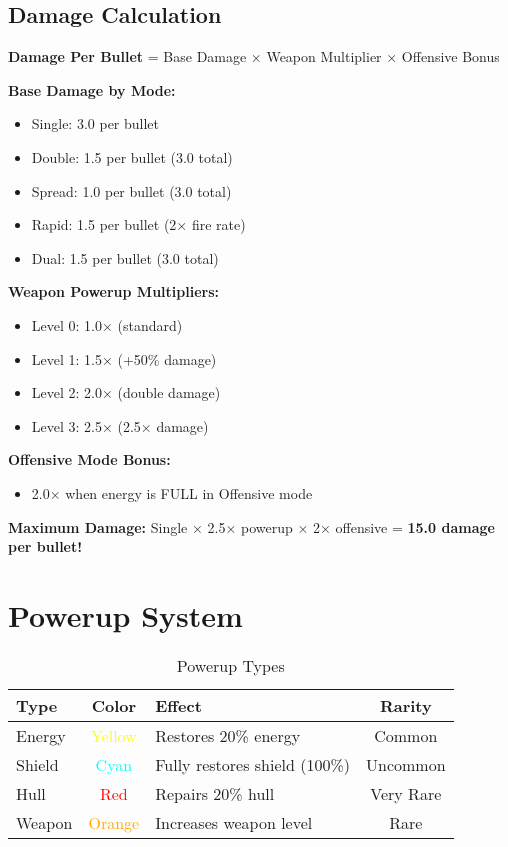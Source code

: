 \documentclass[11pt,a4paper]{article}
\begin{document}
\subsection{Damage Calculation}

\begin{center}
\large
\textbf{Damage Per Bullet} = Base Damage × Weapon Multiplier × Offensive Bonus
\end{center}

\textbf{Base Damage by Mode:}
\begin{itemize}
    \item Single: 3.0 per bullet
    \item Double: 1.5 per bullet (3.0 total)
    \item Spread: 1.0 per bullet (3.0 total)
    \item Rapid: 1.5 per bullet (2× fire rate)
    \item Dual: 1.5 per bullet (3.0 total)
\end{itemize}

\textbf{Weapon Powerup Multipliers:}
\begin{itemize}
    \item Level 0: 1.0× (standard)
    \item Level 1: 1.5× (+50\% damage)
    \item Level 2: 2.0× (double damage)
    \item Level 3: 2.5× (2.5× damage)
\end{itemize}

\textbf{Offensive Mode Bonus:}
\begin{itemize}
    \item 2.0× when energy is FULL in Offensive mode
\end{itemize}

\textbf{Maximum Damage:} Single × 2.5× powerup × 2× offensive = \textbf{15.0 damage per bullet!}

\section{Powerup System}

\begin{table}[h]
\centering
\begin{tabularx}{\textwidth}{|l|c|X|c|}
\hline
\rowcolor{primarycolor!20}
\textbf{Type} & \textbf{Color} & \textbf{Effect} & \textbf{Rarity} \\
\hline
Energy & \textcolor{yellow}{Yellow} & Restores 20\% energy & Common \\
\hline
Shield & \textcolor{cyan}{Cyan} & Fully restores shield (100\%) & Uncommon \\
\hline
Hull & \textcolor{red}{Red} & Repairs 20\% hull & Very Rare \\
\hline
Weapon & \textcolor{orange}{Orange} & Increases weapon level & Rare \\
\hline
\end{tabularx}
\caption{Powerup Types}
\end{table}
\end{document}
